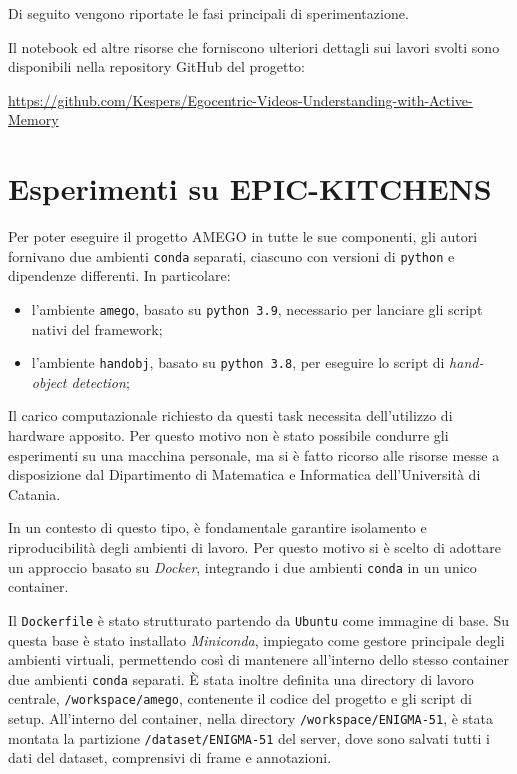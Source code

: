 Di seguito vengono riportate le fasi principali di sperimentazione.

Il notebook ed altre risorse che forniscono ulteriori dettagli sui lavori svolti sono disponibili nella repository GitHub del progetto: 
\begin{center}
    \footnotesize
    \href{https://github.com/Kespers/Egocentric-Videos-Understanding-with-Active-Memory}{https://github.com/Kespers/Egocentric-Videos-Understanding-with-Active-Memory}
\end{center}

\section{Esperimenti su EPIC-KITCHENS}

Per poter eseguire il progetto AMEGO in tutte le sue componenti, gli autori fornivano due ambienti \texttt{conda} separati, ciascuno con versioni di \texttt{python} e dipendenze differenti. In particolare:
\begin{itemize}
    \item l'ambiente \texttt{amego}, basato su \texttt{python 3.9}, necessario per lanciare gli script nativi del framework;
    \item l'ambiente \texttt{handobj}, basato su \texttt{python 3.8}, per eseguire lo script di \emph{hand-object detection};
\end{itemize}

Il carico computazionale richiesto da questi task necessita dell'utilizzo di hardware apposito. Per questo motivo non è stato possibile condurre gli esperimenti su una macchina personale, ma si è fatto ricorso alle risorse messe a disposizione dal Dipartimento di Matematica e Informatica dell'Università di Catania.  

In un contesto di questo tipo, è fondamentale garantire isolamento e riproducibilità degli ambienti di lavoro. Per questo motivo si è scelto di adottare un approccio basato su \emph{Docker}, integrando i due ambienti \texttt{conda} in un unico container.

Il \texttt{Dockerfile} è stato strutturato partendo da \texttt{Ubuntu} come immagine di base. Su questa base è stato installato \emph{Miniconda}, impiegato come gestore principale degli ambienti virtuali, permettendo così di mantenere all'interno dello stesso container due ambienti \texttt{conda} separati.  
È stata inoltre definita una directory di lavoro centrale, \texttt{/workspace/amego}, contenente il codice del progetto e gli script di setup. All'interno del container, nella directory \texttt{/workspace/ENIGMA-51}, è stata montata la partizione \texttt{/dataset/ENIGMA-51} del server, dove sono salvati tutti i dati del dataset, comprensivi di frame e annotazioni. 

